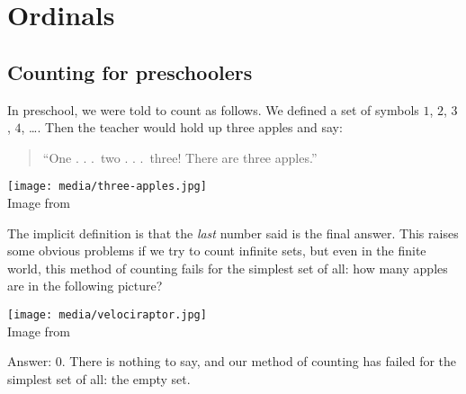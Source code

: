 \chapter{Ordinals}
\label{ch:ordinal}
\section{Counting for preschoolers}
In preschool, we were told to count as follows.
We defined a set of symbols $1$, $2$, $3$, $4$, \dots.
Then the teacher would hold up three apples and say:
\begin{quote}
	``One . . .\ two . . .\ three!  There are three apples.''
\end{quote}

\begin{center}
	\texttt{[image: media/three-apples.jpg]}
	\\ \scriptsize Image from \cite{img:apples}
\end{center}

The implicit definition is that the \emph{last} number said is the final answer.
This raises some obvious problems if we try to count infinite sets,
but even in the finite world,
this method of counting fails for the simplest set of all:
how many apples are in the following picture?

\begin{center}
	\texttt{[image: media/velociraptor.jpg]}
	\\ \scriptsize Image from \cite{img:velociraptor}
\end{center}

Answer: $0$. There is nothing to say, and our method of counting has failed
for the simplest set of all: the empty set.

